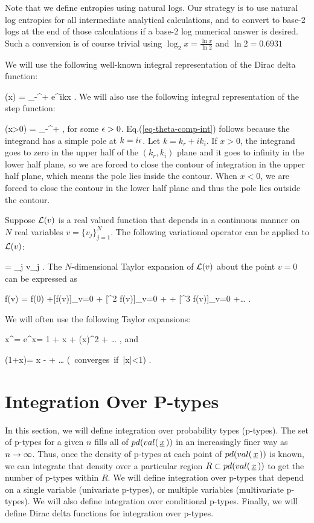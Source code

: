 \documentclass[12pt]{article}
\begin{document}
Note that we
define entropies
using natural logs. Our
strategy is to
use natural log entropies
for all intermediate analytical
calculations, and to
convert
to base-2 logs
at the end of those
calculations if
a base-2 log numerical answer
is desired. Such a conversion is
of course trivial
using $\log_2 x = \frac{\ln x}{\ln 2}$ and
$\ln 2 = 0.6931$


We  will use
the following well-known integral representation
of the Dirac delta function:

\beq
\delta(x) =
\int_{-\infty}^{+\infty}
\;\;  e^{ikx}
\;.
\eeq
We will also use the following
 integral
representation
of the step function:

\beq
\theta(x>0) =
\int_{-\infty}^{+\infty}
\;\;
\;,\label{eq-theta-comp-int}
\eeq
for some ${ \epsilon }>0$.
Eq.(\ref{eq-theta-comp-int})
follows
because the integrand
has a simple pole at $k=i{ \epsilon }$.
Let $k = k_r + i k_i$.
If $x>0$,
the integrand goes to zero
in the upper
half of the $(k_r,k_i)$ plane
and it goes to infinity
in the lower half plane, so we
are forced to close the contour
of integration in the upper half plane,
which means the pole lies inside the contour.
When $x<0$,
we are forced to close the contour in the lower
half plane and thus the pole lies outside
the contour.

Suppose ${ \cal L }(v)$
is a real valued
function
that depends in a continuous
manner on $N$
real variables $v=\{v_j\}_{j=1}^N$.
The following variational
operator can be applied to ${ \cal L }(v)$:

\beq
\delta= \sum_j \delta v_j
\;.
\eeq
The $N$-dimensional Taylor
expansion of ${ \cal L }(v)$
about the point $v=0$ can be expressed as

\beq
f(v) = f(0) +[\delta f(v)]_{v=0} +
[\delta^2 f(v)]_{v=0} + +
[\delta^3 f(v)]_{v=0} +\ldots
\;.
\eeq



We will often use the following
Taylor expansions:

\beq
x^\eps = e^{\eps\ln x}= 1 + \eps \ln x +
(\eps \ln x)^2 + \ldots
\;,
\label{eq-taylor-one}
\eeq
and

\beq
\ln(1+x)= x -  + \ldots
\; (\mbox{ converges if }|x|<1)
\;.
\label{eq-taylor-two}
\eeq




\section{Integration Over P-types}
In this section, we will define
integration over probability types (p-types).
The set of p-types for a
given $n$
fills all of
$pd(val({\,\underline{x}\,}))$
in an increasingly
finer way as $n\rightarrow \infty$. Thus, once
the density
of p-types at
each
point of $pd(val({\,\underline{x}\,}))$ is known,
we can integrate that density
 over
a particular region $R\subset pd(val({\,\underline{x}\,}))$
to get the
number of p-types
within $R$.
We will define
integration over p-types
that depend on a single
variable (univariate p-types),
or multiple variables (multivariate p-types).
We will also define integration over
conditional p-types.
Finally, we will define Dirac
delta functions for integration
over p-types.
\end{document}
